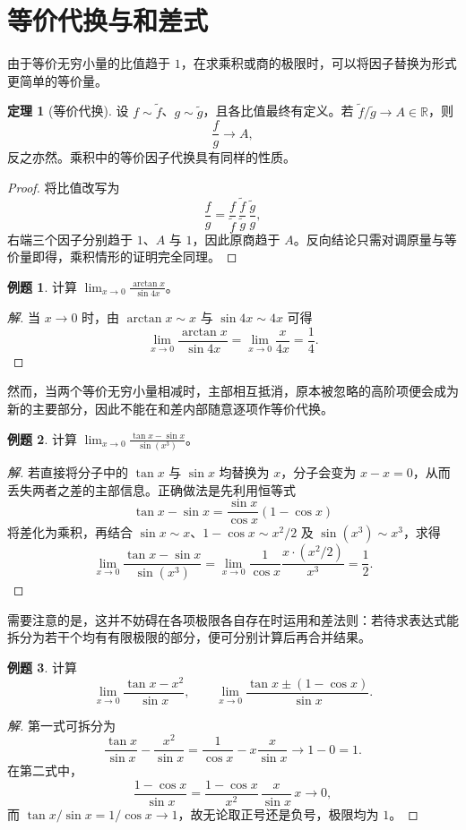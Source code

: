 \documentclass[UTF8,fontset=fandol,a4paper,12pt]{ctexart}
\newcommand{\R}{\mathbb R}
\theoremstyle{definition}
\newtheorem*{theorem}{定理}
\newtheorem*{example}{例题}
\begin{document}
\section{等价代换与和差式}
由于等价无穷小量的比值趋于 $1$，在求乘积或商的极限时，可以将因子替换为形式更简单的等价量。

\begin{theorem}[等价代换]
设 $f\sim\widetilde f$、$g\sim\widetilde g$，且各比值最终有定义。若 $\widetilde f/\widetilde g\to A\in\R$，则
\[
 \frac{f}{g}\to A,
\]
反之亦然。乘积中的等价因子代换具有同样的性质。
\end{theorem}
\begin{proof}
将比值改写为
\[
 \frac{f}{g}
 =\frac{f}{\widetilde f}\,
   \frac{\widetilde f}{\widetilde g}\,
   \frac{\widetilde g}{g},
\]
右端三个因子分别趋于 $1$、$A$ 与 $1$，因此原商趋于 $A$。反向结论只需对调原量与等价量即得，乘积情形的证明完全同理。
\end{proof}

\begin{example}
计算 $\displaystyle\lim_{x\to0}\frac{\arctan x}{\sin4x}$。
\end{example}
\begin{proof}[解]
当 $x\to0$ 时，由 $\arctan x\sim x$ 与 $\sin4x\sim4x$ 可得
\[
 \lim_{x\to0}\frac{\arctan x}{\sin4x}
 =\lim_{x\to0}\frac{x}{4x}=\frac14.
\]
\end{proof}

然而，当两个等价无穷小量相减时，主部相互抵消，原本被忽略的高阶项便会成为新的主要部分，因此不能在和差内部随意逐项作等价代换。

\begin{example}
计算 $\displaystyle\lim_{x\to0}\frac{\tan x-\sin x}{\sin(x^3)}$。
\end{example}
\begin{proof}[解]
若直接将分子中的 $\tan x$ 与 $\sin x$ 均替换为 $x$，分子会变为 $x-x=0$，从而丢失两者之差的主部信息。正确做法是先利用恒等式
\[
 \tan x-\sin x=\frac{\sin x}{\cos x}(1-\cos x)
\]
将差化为乘积，再结合 $\sin x\sim x$、$1-\cos x\sim x^2/2$ 及 $\sin(x^3)\sim x^3$，求得
\[
 \lim_{x\to0}\frac{\tan x-\sin x}{\sin(x^3)}
 =\lim_{x\to0}\frac1{\cos x}\frac{x\cdot(x^2/2)}{x^3}
 =\frac12.
\]
\end{proof}

需要注意的是，这并不妨碍在各项极限各自存在时运用和差法则：若待求表达式能拆分为若干个均有有限极限的部分，便可分别计算后再合并结果。

\begin{example}
计算
\[
 \lim_{x\to0}\frac{\tan x-x^2}{\sin x},\qquad
 \lim_{x\to0}\frac{\tan x\pm(1-\cos x)}{\sin x}.
\]
\end{example}
\begin{proof}[解]
第一式可拆分为
\[
 \frac{\tan x}{\sin x}-\frac{x^2}{\sin x}
 =\frac1{\cos x}-x\frac{x}{\sin x}\to1-0=1.
\]
在第二式中，
\[
 \frac{1-\cos x}{\sin x}
 =\frac{1-\cos x}{x^2}\,\frac{x}{\sin x}\,x\to0,
\]
而 $\tan x/\sin x=1/\cos x\to1$，故无论取正号还是负号，极限均为 $1$。
\end{proof}
\end{document}
